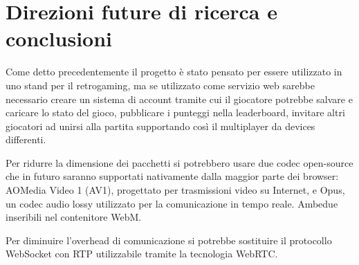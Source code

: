 %
%

\chapter{Direzioni future di ricerca e conclusioni}
Come detto precedentemente il progetto è stato pensato per essere utilizzato in uno stand per il retrogaming, ma se utilizzato come servizio web sarebbe necessario creare un sistema di account tramite cui il giocatore potrebbe salvare e caricare lo stato del gioco, pubblicare i punteggi nella leaderboard, invitare altri giocatori ad unirsi alla partita supportando così il multiplayer da devices differenti.

Per ridurre la dimensione dei pacchetti si potrebbero usare due codec open-source che in futuro saranno supportati nativamente dalla maggior parte dei browser: AOMedia Video 1 (AV1), progettato per trasmissioni video su Internet, e Opus, un codec audio lossy utilizzato per la comunicazione in tempo reale. Ambedue inseribili nel contenitore WebM.

Per diminuire l'overhead di comunicazione si potrebbe sostituire il protocollo WebSocket con RTP utilizzabile tramite la tecnologia WebRTC.